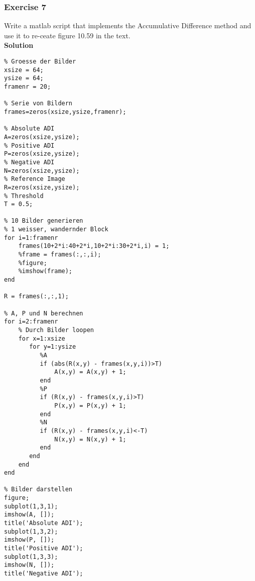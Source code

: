 \subsubsection{Exercise 7}
Write a matlab script that implements the Accumulative Difference method and use it to re-ceate figure 10.59 in the text.\\
\textbf{Solution}
\begin{lstlisting}
% Groesse der Bilder
xsize = 64;
ysize = 64;
framenr = 20;

% Serie von Bildern
frames=zeros(xsize,ysize,framenr);

% Absolute ADI
A=zeros(xsize,ysize);
% Positive ADI
P=zeros(xsize,ysize);
% Negative ADI
N=zeros(xsize,ysize);
% Reference Image
R=zeros(xsize,ysize);
% Threshold
T = 0.5;

% 10 Bilder generieren
% 1 weisser, wandernder Block
for i=1:framenr
    frames(10+2*i:40+2*i,10+2*i:30+2*i,i) = 1;
    %frame = frames(:,:,i);
    %figure;
    %imshow(frame);
end

R = frames(:,:,1);

% A, P und N berechnen
for i=2:framenr
    % Durch Bilder loopen
    for x=1:xsize
       for y=1:ysize
          %A
          if (abs(R(x,y) - frames(x,y,i))>T)
              A(x,y) = A(x,y) + 1;
          end
          %P
          if (R(x,y) - frames(x,y,i)>T)
              P(x,y) = P(x,y) + 1;
          end
          %N
          if (R(x,y) - frames(x,y,i)<-T)
              N(x,y) = N(x,y) + 1;
          end
       end
    end
end

% Bilder darstellen
figure;
subplot(1,3,1);
imshow(A, []);
title('Absolute ADI');
subplot(1,3,2);
imshow(P, []);
title('Positive ADI');
subplot(1,3,3);
imshow(N, []);
title('Negative ADI');
\end{lstlisting}